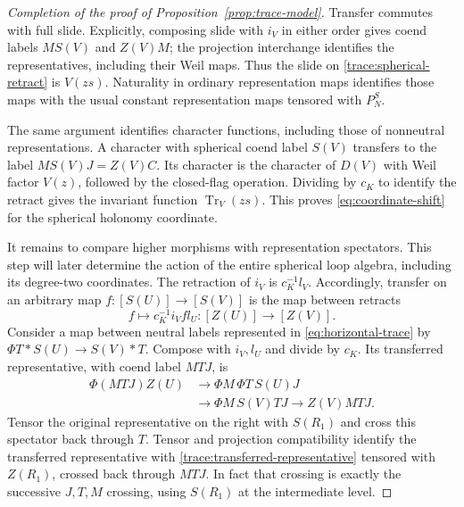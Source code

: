 \documentclass[11pt]{article}
\numberwithin{equation}{section}
\theoremstyle{definition}
\theoremstyle{remark}
\newcommand{\Tr}{\operatorname{Tr}}
\begin{document}
\begin{proof}[Completion of the proof of Proposition~\ref{prop:trace-model}]
Transfer commutes with full slide.  Explicitly, composing slide with
$i_V$ in either order gives coend labels $MS(V)$ and $Z(V)M$;
the projection interchange identifies the representatives, including
their Weil maps.  Thus the slide on
\eqref{trace:spherical-retract} is $V(zs)$.  Naturality in ordinary
representation maps identifies those maps with the usual constant
representation maps tensored with $P_N^S$.

The same argument identifies character functions, including those of
nonneutral representations.  A character with spherical coend label
$S(V)$ transfers to the label $MS(V)J=Z(V)C$.  Its character is the
character of $D(V)$ with Weil factor $V(z)$, followed by the closed-flag
operation.  Dividing by $c_K$ to identify the retract gives the
invariant function $\Tr_V(zs)$.  This proves
\eqref{eq:coordinate-shift} for the spherical holonomy coordinate.

It remains to compare higher morphisms with representation
spectators.  This step will later determine the action of the entire
spherical loop algebra, including its degree-two coordinates.
The retraction of $i_V$ is $c_K^{-1}l_V$.  Accordingly, transfer on
an arbitrary map $f:[S(U)]\to[S(V)]$ is the map between retracts
\[
 f\longmapsto c_K^{-1}i_V f l_U:
 [Z(U)]\longrightarrow[Z(V)].
\]
Consider a map between neutral labels represented in
\eqref{eq:horizontal-trace} by
$\Phi T*S(U)\to S(V)*T$.  Compose with $i_V,l_U$ and divide by
$c_K$.  Its transferred representative, with coend label $MTJ$, is
\begin{equation}\label{trace:transferred-representative}
\begin{split}
 \Phi(MTJ)Z(U)&\longrightarrow\Phi M\,\Phi T\,S(U)J\\
 &\longrightarrow\Phi M\,S(V)TJ
 \longrightarrow Z(V)MTJ.
\end{split}
\end{equation}
Tensor the original representative on the right with $S(R_1)$ and
cross this spectator back through $T$.  Tensor and projection
compatibility identify the transferred representative with
\eqref{trace:transferred-representative} tensored with $Z(R_1)$,
crossed back through $MTJ$.  In fact that crossing is exactly the
successive $J,T,M$ crossing, using $S(R_1)$ at the intermediate level.


\end{proof}
\end{document}

